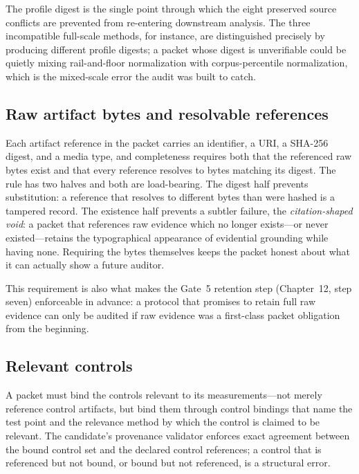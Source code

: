 The profile digest is the single point through which the eight preserved source conflicts are prevented from re-entering downstream analysis. The three incompatible full-scale methods, for instance, are distinguished precisely by producing different profile digests; a packet whose digest is unverifiable could be quietly mixing rail-and-floor normalization with corpus-percentile normalization, which is the mixed-scale error the audit was built to catch.

\subsection{Raw artifact bytes and resolvable references}\label{elig:sec:rawbytes}

Each artifact reference in the packet carries an identifier, a URI, a SHA-256 digest, and a media type, and completeness requires both that the referenced raw bytes exist and that every reference resolves to bytes matching its digest. The rule has two halves and both are load-bearing. The digest half prevents substitution: a reference that resolves to different bytes than were hashed is a tampered record. The existence half prevents a subtler failure, the \emph{citation-shaped void}: a packet that references raw evidence which no longer exists---or never existed---retains the typographical appearance of evidential grounding while having none. Requiring the bytes themselves keeps the packet honest about what it can actually show a future auditor.

This requirement is also what makes the Gate~5 retention step (Chapter~12, step seven) enforceable in advance: a protocol that promises to retain full raw evidence can only be audited if raw evidence was a first-class packet obligation from the beginning.

\subsection{Relevant controls}\label{elig:sec:controls}

A packet must bind the controls relevant to its measurements---not merely reference control artifacts, but bind them through control bindings that name the test point and the relevance method by which the control is claimed to be relevant. The candidate's provenance validator enforces exact agreement between the bound control set and the declared control references; a control that is referenced but not bound, or bound but not referenced, is a structural error.

